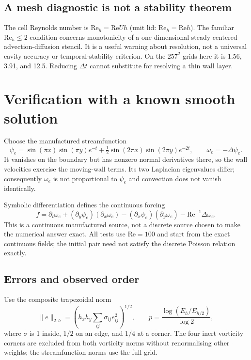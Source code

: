 \documentclass[11pt,a4paper]{article}
\newcommand{\Rey}{\mathrm{Re}}
\newcommand{\dt}{\Delta t}
\begin{document}
\subsection{A mesh diagnostic is not a stability theorem}
The cell Reynolds number is $\Rey_h=\Rey Uh$ (unit lid: $\Rey_h=\Rey h$).
The familiar $\Rey_h\leq2$ condition concerns monotonicity of a one-dimensional
steady centered advection-diffusion stencil. It is a useful warning about
resolution, not a universal cavity accuracy or temporal-stability criterion.
On the $257^2$ grids here it is 1.56, 3.91, and 12.5. Reducing $\dt$ cannot
substitute for resolving a thin wall layer.

\clearpage
\section{Verification with a known smooth solution}\label{sec:verification}
Choose the manufactured streamfunction
\begin{equation}
\psi_e=\sin(\pi x)\sin(\pi y)e^{-t}
+\tfrac12\sin(2\pi x)\sin(2\pi y)e^{-2t},\qquad
\omega_e=-\Delta\psi_e.
\end{equation}
It vanishes on the boundary but has nonzero normal derivatives there, so the
wall velocities exercise the moving-wall terms. Its two Laplacian eigenvalues
differ; consequently $\omega_e$ is not proportional to $\psi_e$ and convection
does not vanish identically.

Symbolic differentiation defines the continuous forcing
\begin{equation}
f=\partial_t\omega_e+(\partial_y\psi_e)(\partial_x\omega_e)
-(\partial_x\psi_e)(\partial_y\omega_e)-\Rey^{-1}\Delta\omega_e.
\end{equation}
This is a continuous manufactured source, not a discrete source chosen to make
the numerical answer exact. All tests use $\Rey=100$ and start from the exact
continuous fields; the initial pair need not satisfy the discrete Poisson
relation exactly.

\subsection{Errors and observed order}
Use the composite trapezoidal norm
\begin{equation}
\|e\|_{2,h}=\left(h_xh_y\sum_{ij}\sigma_{ij}e_{ij}^2\right)^{1/2},
\qquad p=\frac{\log(E_h/E_{h/2})}{\log2},
\end{equation}
where $\sigma$ is 1 inside, $1/2$ on an edge, and $1/4$ at a corner.
The four inert vorticity corners are excluded from both vorticity norms without
renormalising other weights; the streamfunction norms use the full grid.
\end{document}

